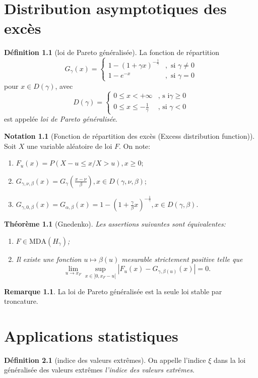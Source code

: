 \documentclass[10p,a4paper,reqno,titlepage]{report}
\newcounter{dader}[chapter]
\theoremstyle{plain}
\newtheorem{thm}[thms]{Théorème}
\theoremstyle{definition}
\newtheorem{de}[de]{Définition}
\newtheorem*{nota}{Notation}
\newtheorem{rem}[dader]{Remarque}
\newcommand{\vabs}[1]{\left\vert #1 \right\vert}
\begin{document}
\chapter{Distribution asymptotiques des excès}
\begin{de}[loi de Pareto généralisée]
	La fonction de répartition 
	$$G_\gamma (x) = \left\{\begin{array}{ll} 1 -(1+\gamma x)^{-\tfrac{1}{\gamma}}& , \text{ si }\gamma \neq 0 \\ 1 - e^{-x}& ,\text{ si }\gamma = 0
		\end{array}\right.$$
	pour $x \in D(\gamma)$, avec
	 $$ D (\gamma )= \left\{\begin{array}{ll}0 \leq x < + \infty & \text{, s i} \gamma \geq 0\\ 0 \leq x \leq -\tfrac{1}{\gamma} & \text{, si } \gamma < 0
	 	 \end{array}\right.$$
 	 est appelée \textit{loi de Pareto généralisée}.
\end{de}
\begin{nota}[Fonction de répartition des excès (Excess distribution function)] Soit $X$ une variable aléatoire de loi $F$. On note:\
	\begin{enumerate}
		\item $F_u (x) =P( X- u \leq x / X>u), x \geq 0$;
		\item $G_{\gamma, \nu,\beta}(x)= G_\gamma (\tfrac{x -\nu}{\beta}), x \in D(\gamma, \nu , \beta)$;
		\item $G_{\gamma, 0 ,\beta}(x)= G_{\alpha,\beta}(x)= 1 - (1+ \tfrac{\gamma}{\beta}x)^{-\tfrac{1}{\gamma}}, x \in D (\gamma, \beta).$
	\end{enumerate}
\end{nota}
\begin{thm}[Gnedenko]
Les assertions suivantes sont équivalentes:\
\begin{enumerate}
	\item $F \in \mathrm{MDA}(H_\gamma)$;
	\item Il existe une fonction $u\mapsto \beta(u)$ mesurable strictement positive telle que 
	$$ \lim_{u \to x_F} \sup_{x\in ]0,x_F - u[} \vabs{ F_u (x) -G_{\gamma,\beta(u)}(x)} =0.$$
\end{enumerate}
\end{thm}
\begin{rem}
	La loi de Pareto généralisée est la seule loi stable par troncature.
\end{rem}
\chapter{Applications statistiques}
\begin{de}[indice des valeurs extrêmes]
	On appelle l'indice $\xi$ dans la loi généralisée des valeurs extrêmes \textit{l'indice des valeurs extrêmes}.
\end{de}
\end{document}
